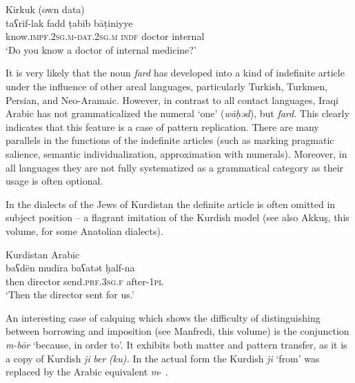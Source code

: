\documentclass[output=paper]{langsci/langscibook}
\begin{document}
\ea\label{fadd} 
{Kirkuk (own data)}\\
\gll taʕrif-lak fadd ṭabīb bāṭiniyye\\
     know.\textsc{impf.2sg.m-dat.2sg.m} \textsc{indf} doctor internal \\
\glt ‘Do you know a doctor of internal medicine?'
\z

It is very likely that the noun \textit{fard} has developed into a kind of indefinite article under the influence of other areal languages, particularly Turkish, Turkmen, Persian, and Neo-Aramaic. However, in contrast to all contact languages, Iraqi Arabic has not grammaticalized the numeral ‘one’ (\textit{wāḥəd}), but \textit{fard}. This clearly indicates that this feature is a case of pattern replication. There are many parallels in the functions of the indefinite articles (such as marking pragmatic salience, semantic individualization, approximation with numerals). Moreover, in all languages they are not fully systematized as a grammatical category as their usage is often optional. 

In the dialects of the Jews of Kurdistan the definite article is often omitted in subject position – a flagrant imitation of the Kurdish model (see also Akkuş, this volume, for some Anatolian dialects).

\ea 
{Kurdistan Arabic \citep[71]{Jastrow1990chapter}} \\
\gll baʕdēn mudīra baʕatət ḫalf-na\\
     then director send.\textsc{prf.3sg.f} after-\textsc{1pl}\\
\glt ‘Then the director sent for us.’
\z

An interesting case of calquing which shows the difficulty of distinguishing between borrowing and imposition (see Manfredi, this volume) is the conjunction \textit{m-bōr} ‘because, in order to’. It exhibits both matter and pattern transfer, as it is a copy of Kurdish \textit{ji} \textit{ber} \textit{(ku).} In the actual form the Kurdish \textit{ji} ‘from’ was replaced by the Arabic equivalent \textit{m}{}- \citep[64]{Jastrow1979}. 
\end{document}
